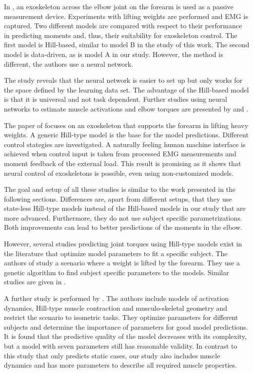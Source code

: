 In \cite{Rosen1999}, an exoskeleton across the elbow joint on the forearm is used as a passive measurement device. Experiments with lifting weights are performed and EMG is captured.
Two different models are compared with respect to their performance in predicting moments and, thus, their suitability for exoskeleton control.
The first model is Hill-based, similar to model B in the study of this work.
The second model is data-driven, as is model A in our study. However, the method is different, the authors use a neural network.

The study reveals that the neural network is easier to set up but only works for the space defined by the learning data set. The advantage of the Hill-based model is that it is universal and not task dependent. 
Further studies using neural networks to estimate muscle activations and elbow torques are presented by \cite{Wang2002} and \cite{Song2005}.
%

The paper of \cite{Rosen2001} focuses on an exoskeleton that supports the forearm in lifting heavy weights. A generic Hill-type model is the base for the model predictions. Different control stategies are investigated. 
A naturally feeling human machine interface is achieved when
control input is taken from processed EMG measurements and moment feedback of the external load. 
This result is promising as it shows that neural control of exoskeletons is possible, even using non-customized models. 

The goal and setup of all these studies is similar to the work presented in the following sections. Differences are, apart from different setups, that they use state-less Hill-type models instead of the Hill-based models in our study that are more advanced. Furthermore, they do not use subject specific parametrizations. Both improvements can lead to better predictions of the moments in the elbow.

%
However, several studies predicting joint torques using Hill-type models exist in the literature that optimize model parameters to fit a specific subject.
The authors of \cite{Cavallaro2005, Cavallaro2006} study a scenario where a weight is lifted by the forearm. They use a genetic algorithm to find subject specific parameters to the models. Similar studies are given in \cite{Lloyd2003,Venture2005,Pontonnier2009,Sartori2012}.

A further study is performed by \cite{Heine2003}. The authors include models of activation dynamics, Hill-type muscle contraction and musculo-skeletal geometry and restrict the scenario to isometric tasks. They optimize parameters for different subjects and determine the importance of parameters for good model predictions. It is found that the predictive quality of the model decreases with its complexity, but a model with seven parameters still has reasonable validity. 
In contrast to this study that only predicts static cases, our study also includes muscle dynamics and has more parameters to describe all required muscle properties.

